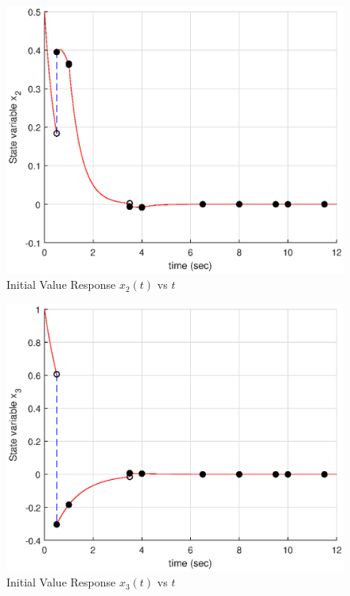 \documentclass[11pt,a4paper]{article}
\begin{document}
\begin{figure}
\centering
\includegraphics[scale=0.8]{FG6.eps} 
\caption{Initial Value Response $x_2(t)$ vs $t$}
\end{figure}

\begin{figure}
\centering
\includegraphics[scale=0.8]{FG7.eps} 
\caption{Initial Value Response $x_3(t)$ vs $t$}
\end{figure}
\end{document}
